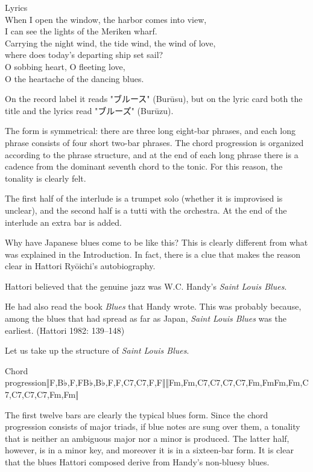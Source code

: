 \begin{verseblock}
Lyrics\\[0.9em]
When I open the window, the harbor comes into view,\\
I can see the lights of the Meriken wharf.\\[0.9em]
Carrying the night wind, the tide wind, the wind of love,\\
where does today's departing ship set sail?\\[0.9em]
O sobbing heart, O fleeting love,\\
O the heartache of the dancing blues.
\end{verseblock}

On the record label it reads "ブルース" (Burūsu), but on the lyric card both the title and the lyrics read "ブルーズ" (Burūzu).

The form is symmetrical: there are three long eight-bar phrases, and each long phrase consists of four short two-bar phrases. The chord progression is organized according to the phrase structure, and at the end of each long phrase there is a cadence from the dominant seventh chord to the tonic. For this reason, the tonality is clearly felt.

The first half of the interlude is a trumpet solo (whether it is improvised is unclear), and the second half is a tutti with the orchestra. At the end of the interlude an extra bar is added.

Why have Japanese blues come to be like this? This is clearly different from what was explained in the Introduction. In fact, there is a clue that makes the reason clear in Hattori Ryōichi's autobiography.

Hattori believed that the genuine jazz was W.C. Handy's \textit{Saint Louis Blues}.

He had also read the book \textit{Blues} that Handy wrote. This was probably because, among the blues that had spread as far as Japan, \textit{Saint Louis Blues} was the earliest. (Hattori 1982: 139–148)

Let us take up the structure of \textit{Saint Louis Blues}.

\begin{gquote}
Chord progression‖F,B♭,F,FB♭,B♭,F,F,C7,C7,F,F‖‖Fm,Fm,C7,C7,C7,C7,Fm,FmFm,Fm,C7,C7,C7,C7,Fm,Fm‖
\end{gquote}

The first twelve bars are clearly the typical blues form. Since the chord progression consists of major triads, if blue notes are sung over them, a tonality that is neither an ambiguous major nor a minor is produced. The latter half, however, is in a minor key, and moreover it is in a sixteen-bar form. It is clear that the blues Hattori composed derive from Handy's non-bluesy blues.

